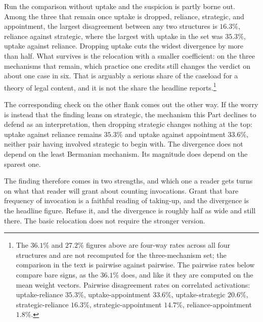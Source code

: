 Run the comparison without uptake and the suspicion is partly borne out.
Among the three that remain once uptake is dropped, reliance, strategic, and
appointment, the largest disagreement between
any two structures is $16.3\%$, reliance against strategic, where the
largest with uptake in the set was $35.3\%$, uptake against reliance.
Dropping uptake cuts the widest divergence by more than half. What
survives is the relocation with a smaller coefficient: on the three
mechanisms that remain, which practice one credits still changes the
verdict on about one case in six. That is arguably a serious share of the caseload for a theory of legal
content, and it is not the share the headline reports.\footnote{The $36.1\%$ and $27.2\%$ figures above are four-way
rates across all four structures and are not recomputed for the
three-mechanism set; the comparison in the text is pairwise against pairwise.
The pairwise rates below compare bare signs, as the $36.1\%$ does, and like it
they are computed on the mean weight vectors. Pairwise disagreement rates on
correlated activations:
uptake-reliance $35.3\%$, uptake-appointment $33.6\%$, uptake-strategic
$20.6\%$, strategic-reliance $16.3\%$, strategic-appointment $14.7\%$,
reliance-appointment $1.8\%$.}

The corresponding check on the other flank comes out the other way. If
the worry is instead that the finding leans on strategic, the mechanism this Part declines to defend as an interpretation, then
dropping strategic changes nothing at the top: uptake against reliance remains
$35.3\%$ and uptake against appointment $33.6\%$, neither pair having
involved strategic to begin with. The divergence does not depend on the
least Bermanian mechanism. Its magnitude does depend on the sparest one.

The finding therefore comes in two strengths, and which one a reader gets
turns on what that reader will grant about counting invocations. Grant
that bare frequency of invocation is a faithful reading of taking-up, and
the divergence is the headline figure. Refuse it, and the divergence is
roughly half as wide and still there. The basic relocation does not
require the stronger version.


